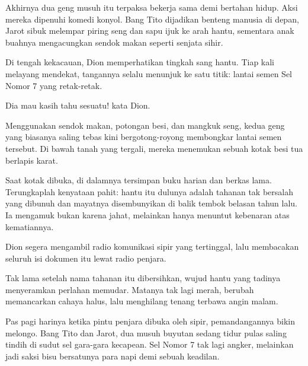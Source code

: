 Akhirnya dua geng musuh itu terpaksa bekerja sama demi bertahan hidup. Aksi mereka dipenuhi komedi konyol. Bang Tito dijadikan benteng manusia di depan, Jarot sibuk melempar piring seng dan sapu ijuk ke arah hantu, sementara anak buahnya mengacungkan sendok makan seperti senjata sihir.


Di tengah kekacauan, Dion memperhatikan tingkah sang hantu. Tiap kali melayang mendekat, tangannya selalu menunjuk ke satu titik: lantai semen Sel Nomor 7 yang retak-retak.


Dia mau kasih tahu sesuatu! kata Dion.


Menggunakan sendok makan, potongan besi, dan mangkuk seng, kedua geng yang biasanya saling tebas kini bergotong-royong membongkar lantai semen tersebut. Di bawah tanah yang tergali, mereka menemukan sebuah kotak besi tua berlapis karat.


Saat kotak dibuka, di dalamnya tersimpan buku harian dan berkas lama. Terungkaplah kenyataan pahit: hantu itu dulunya adalah tahanan tak bersalah yang dibunuh dan mayatnya disembunyikan di balik tembok belasan tahun lalu. Ia mengamuk bukan karena jahat, melainkan hanya menuntut kebenaran atas kematiannya.


Dion segera mengambil radio komunikasi sipir yang tertinggal, lalu membacakan seluruh isi dokumen itu lewat radio penjara.


Tak lama setelah nama tahanan itu dibersihkan, wujud hantu yang tadinya menyeramkan perlahan memudar. Matanya tak lagi merah, berubah memancarkan cahaya halus, lalu menghilang tenang terbawa angin malam.


Pas pagi harinya ketika pintu penjara dibuka oleh sipir, pemandangannya bikin melongo. Bang Tito dan Jarot, dua musuh buyutan sedang tidur pulas saling tindih di sudut sel gara-gara kecapean. Sel Nomor 7 tak lagi angker, melainkan jadi saksi bisu bersatunya para napi demi sebuah keadilan.


\jedahias

